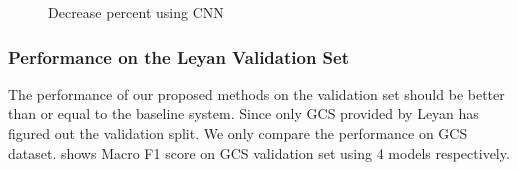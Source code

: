 \begin{figure}[th!]
\begin{center}
	\end{center}
	\noindent
	\begin{center}
	\end{center}
	\noindent
	\begin{center}
	\end{center}
	\caption{Decrease percent using CNN}
	\label{fig:sample_decrease_cnn}
\end{figure}


\subsubsection{Performance on the Leyan Validation Set}
The performance of our proposed methods on the validation set should be better than or equal to the baseline system. Since only GCS provided by Leyan has figured out the validation split. We only compare the performance on GCS dataset.
 shows Macro F1 score on GCS validation set using 4 models respectively.


